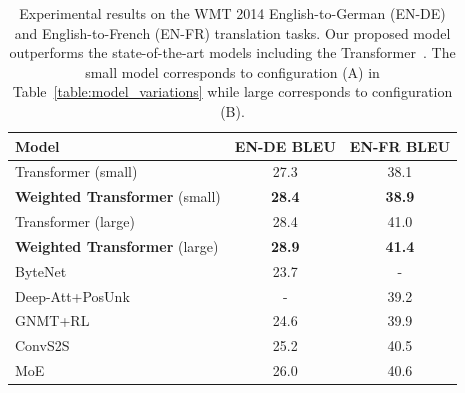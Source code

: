 \documentclass{article} %
\newcommand{\name}{Weighted Transformer\xspace}
\begin{document}
\begin{table}
\center
\begin{tabular}{l|c|c}
\toprule
\bf Model & \bf EN-DE BLEU & \bf EN-FR BLEU \\
\midrule
Transformer (small)~\citep{vaswani2017attention} & 27.3 & 38.1\\ 
\textbf{\name} (small) & \textbf{28.4} & \textbf{38.9} \\  
\midrule
Transformer (large)~\citep{vaswani2017attention} & 28.4  & 41.0\\ 
\textbf{\name} (large) & \textbf{28.9} & \textbf{41.4} \\ 
\midrule
ByteNet~\citep{kalchbrenner2016neural} & 23.7 & - \\
Deep-Att+PosUnk~\citep{zhou2016deep} & - & 39.2 \\
GNMT+RL~\citep{wu2016google} & 24.6 & 39.9 \\
ConvS2S~\citep{gehring2017convs2s} & 25.2 & 40.5 \\
MoE~\citep{shazeer2017outrageously} & 26.0 & 40.6 \\
\bottomrule
\end{tabular}
\caption{
Experimental results on the WMT 2014 English-to-German (EN-DE) and English-to-French (EN-FR) translation tasks. Our proposed model outperforms the state-of-the-art models including the Transformer~\citep{vaswani2017attention}. The small model corresponds to configuration (A) in Table~\ref{table:model_variations} while large corresponds to configuration (B).
}
\label{table:results}
\end{table}
\end{document}
